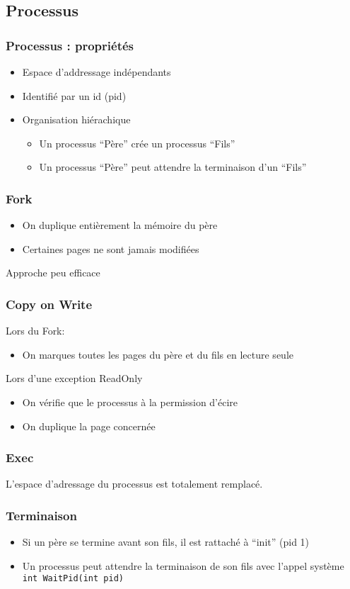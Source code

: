 \documentclass{beamer}
\begin{document}
\subsection{Processus}
\begin{frame}
  \frametitle{Processus : propriétés}
  \begin{itemize}
  \item Espace d'addressage indépendants
  \item Identifié par un id (pid)
  \item Organisation hiérachique
    \begin{itemize}
    \item Un processus ``Père'' crée un processus ``Fils''
    \item Un processus ``Père'' peut attendre la terminaison d'un ``Fils''
    \end{itemize}
  \end{itemize}
\end{frame}

\begin{frame}
  \frametitle{Fork}
  \begin{itemize}
  \item On duplique entièrement la mémoire du père
  \item Certaines pages ne sont jamais modifiées
  \end{itemize}
  Approche peu efficace
\end{frame}

\begin{frame}
  \frametitle{Copy on Write}
  Lors du Fork:
  \begin{itemize}
    \item On marques toutes les pages du père et du fils en lecture seule
  \end{itemize}

  Lors d'une exception ReadOnly
  \begin{itemize}
  \item On vérifie que le processus à la permission d'écire
  \item On duplique la page concernée
  \end{itemize}
\end{frame}

\begin{frame}
  \frametitle{Exec}
  L'espace d'adressage du processus est totalement remplacé.
\end{frame}

\begin{frame}
  \frametitle{Terminaison}
  \begin{itemize}
    \item Si un père se termine avant son fils, il est rattaché à ``init'' (pid 1)
    \item Un processus peut attendre la terminaison de son fils avec l'appel système \texttt{int WaitPid(int pid)}
  \end{itemize}

\end{frame}
\end{document}
